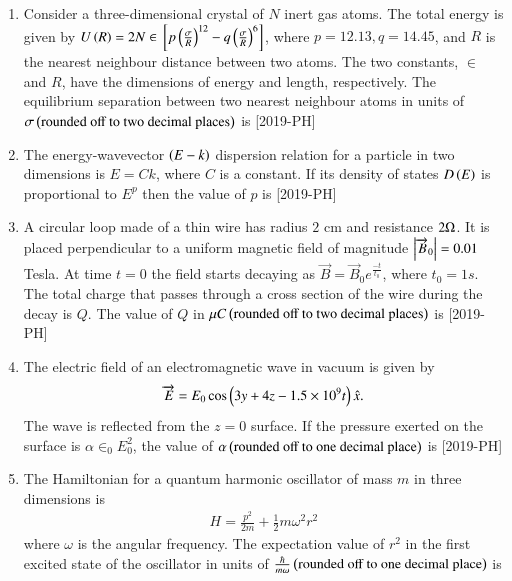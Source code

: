 \documentclass[journal]{IEEEtran}
\begin{document}
\begin{enumerate}[start=27]
\item Consider a three-dimensional crystal of $N$ inert gas atoms. The total energy is given by $U\left(R\right)=2N \in {}\left[p\left(\frac{\sigma}{R}\right)^{12}-q\left(\frac{\sigma}{R}\right)^{6}\right]$, where $p=12.13, q=14.45$, and $R$ is the nearest neighbour distance between two atoms. The two constants, $\in$ and $R$, have the dimensions of energy and length, respectively. The equilibrium separation between two nearest neighbour atoms in units of $\sigma \left(\text{rounded off to two decimal places}\right)$ is \underline{\hspace{1cm}} \hfill{[2019-PH]}\\
\item The energy-wavevector $\left(E-k\right)$ dispersion relation for a particle in two dimensions is $E=Ck$, where $C$ is a constant. If its density of states $D\left(E\right)$ is proportional to $E^p$ then the value of $p$ is \underline{\hspace{1cm}} \hfill{[2019-PH]}\\
\item A circular loop made of a thin wire has radius $2$ cm and resistance $2\ohm$. It is placed perpendicular to a uniform magnetic field of magnitude $\left\vert\overrightarrow{B}_0\right\vert=0.01$ Tesla. At time $t=0$ the field starts decaying as $\overrightarrow{B}=\overrightarrow{B}_0 e^{\frac{-t}{t_{0}}}$, where $t_{0}=1s$. The total charge that passes through a cross section of the wire during the decay is $Q$. The value of $Q$ in $\mu C \left(\text{rounded off to two decimal places}\right)$ is \underline{\hspace{1cm}} \hfill{[2019-PH]}\\
\item The electric field of an electromagnetic wave in vacuum is given by \\
\begin{align*}
    \overrightarrow{E}=E_{0} \cos \left(3y+4z-1.5 \times 10^{9} t\right) \hat{x}.
\end{align*}
The wave is reflected from the $z=0$ surface. If the pressure exerted on the surface is $\alpha\in_{0}E_0^{2}$, the value of $\alpha \left(\text{rounded off to one decimal place}\right)$ is  \underline{\hspace{1cm}} \hfill{[2019-PH]}\\
\item The Hamiltonian for a quantum harmonic oscillator of mass $m$ in three dimensions is \\
\begin{align*}
    H=\frac{p^{2}}{2m}+\frac{1}{2}m \omega^{2}r^{2}
\end{align*}
where $\omega$ is the angular frequency. The expectation value of $r^{2}$ in the first excited state of the oscillator in units of $\frac{\hbar}{m\omega} \left(\text{rounded off to one decimal place}\right)$
is \underline{\hspace{1cm}}


\end{enumerate}
\end{document}
